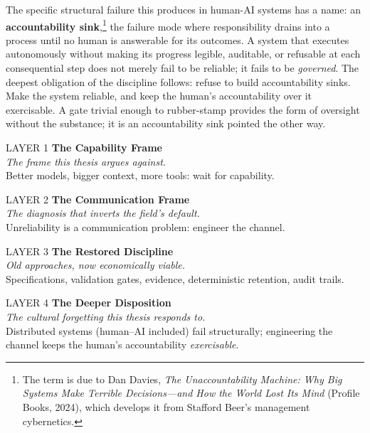 \documentclass[11pt, a4paper]{article}
\begin{document}
The specific structural failure this produces in human-AI systems has a name:
an \textbf{accountability sink},\footnote{The term is due to Dan Davies, \emph{The Unaccountability Machine: Why Big Systems Make Terrible Decisions---and How the World Lost Its Mind} (Profile Books, 2024), which develops it from Stafford Beer's management cybernetics.} the failure mode where responsibility drains into a
process until no human is answerable for its outcomes. A system that executes
autonomously without making its progress legible, auditable, or refusable at each
consequential step does not merely fail to be reliable; it fails to be \emph{governed}.
The deepest obligation of the discipline follows: refuse to build accountability sinks.
Make the system reliable, and keep the human's accountability over it exercisable. A gate trivial enough to
rubber-stamp provides the form of oversight without the substance; it is an
accountability sink pointed the other way.

\smallskip

\newcommand{\layerband}[7]{%
  \noindent\colorbox{#1}{%
    \begin{minipage}{\dimexpr\linewidth-2\fboxsep\relax}%
      \vspace{3pt}%
      {\labelfont\fontsize{7.5}{9}\selectfont\color{#2} #4}\hspace{8pt}%
      {\headingfont\fontsize{10.5}{13}\bfseries\color{#3} #5}\\[2.5pt]%
      {\fontsize{8.5}{11}\itshape\color{#2} #6}\\[2pt]%
      {\fontsize{8.5}{11.5}\selectfont\color{nearblack} #7}%
      \vspace{3pt}%
    \end{minipage}}\par\nobreak\vspace{2pt}%
}
\noindent\begin{minipage}{\linewidth}
\setlength{\parindent}{0pt}
\layerband{verylightgray}{muted}{nearblack}{LAYER 1}{The Capability Frame}{The frame this thesis argues against.}{Better models, bigger context, more tools: wait for capability.}
\layerband{verylightgray}{muted}{nearblack}{LAYER 2}{The Communication Frame}{The diagnosis that inverts the field's default.}{Unreliability is a communication problem: engineer the channel.}
\layerband{cyan!8}{indigo}{indigo}{LAYER 3}{The Restored Discipline}{Old approaches, now economically viable.}{Specifications, validation gates, evidence, deterministic retention, audit trails.}
\layerband{verylightgray}{muted}{nearblack}{LAYER 4}{The Deeper Disposition}{The cultural forgetting this thesis responds to.}{Distributed systems (human--AI included) fail structurally; engineering the channel keeps the human's accountability \emph{exercisable}.}
\end{minipage}
\end{document}
